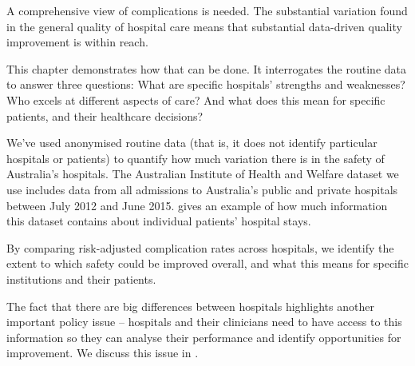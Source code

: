\documentclass[FrontPage]{grattan}
\begin{document}
A comprehensive view of complications is needed.
The substantial variation found in the general quality of hospital care means that substantial data-driven quality improvement is within reach.

This chapter demonstrates how that can be done.
It interrogates the routine data to answer three questions: What are specific hospitals' strengths and weaknesses? Who excels at different aspects of care? And what does this mean for specific patients, and their healthcare decisions?

We've used anonymised routine data (that is, it does not identify particular hospitals or patients) to quantify how much variation there is in the safety of Australia's hospitals.
The Australian Institute of Health and Welfare dataset we use includes data from all admissions to Australia's public and private hospitals between July 2012 and June 2015.
 gives an example of how much information this dataset contains about individual patients' hospital stays.

By comparing risk-adjusted complication rates across hospitals, we identify the extent to which safety could be improved overall, and what this means for specific institutions and their patients.

The fact that there are big differences between hospitals highlights another important policy issue -- hospitals and their clinicians need to have access to this information so they can analyse their performance and identify opportunities for improvement.
We discuss this issue in .
\end{document}
